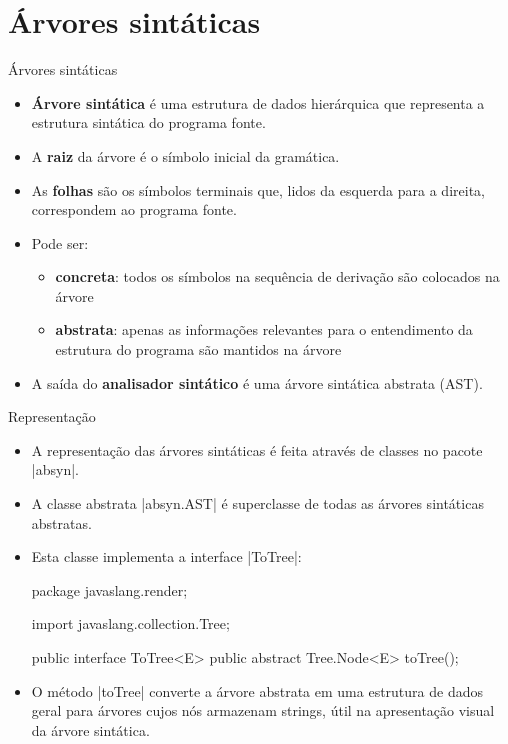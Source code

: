 \documentclass[smaller]{beamer}
\begin{document}
\section{Árvores sintáticas}

\begin{frame}{Árvores sintáticas}
  \begin{itemize}
    \item \textbf{Árvore sintática} é uma \alert{estrutura de dados
      hierárquica} que representa a estrutura sintática do programa
    fonte.
    \item A \textbf{raiz} da árvore é o \alert{símbolo inicial} da
    gramática.
    \item As \textbf{folhas} são os \alert{símbolos terminais} que,
    lidos da esquerda para a direita, correspondem ao programa fonte.
    \item Pode ser:
    \begin{itemize}
      \item \textbf{concreta}: todos os símbolos na sequência de
      derivação são colocados na árvore
      \item \textbf{abstrata}: apenas as informações relevantes para o
      entendimento da estrutura do programa são mantidos na árvore
    \end{itemize}
    \item A saída do \textbf{analisador sintático} é uma árvore
    sintática abstrata (\alert{AST}).
  \end{itemize}
\end{frame}

\begin{frame}{Representação}
  \begin{itemize}
    \item A representação das árvores sintáticas é feita através de
    classes no pacote \pyginline|absyn|.
    \item A classe abstrata \pyginline|absyn.AST| é superclasse de
    todas as árvores sintáticas abstratas.
    \item Esta classe implementa a interface \pyginline|ToTree|:
\begin{pygmented}[]
package javaslang.render;

import javaslang.collection.Tree;

public interface ToTree<E> {
    public abstract Tree.Node<E> toTree();
}
\end{pygmented}
    \item O método \pyginline|toTree| converte a árvore abstrata em
    uma estrutura de dados geral para árvores cujos nós armazenam
    strings, útil na apresentação visual da árvore sintática.
  \end{itemize}
\end{frame}
\end{document}

